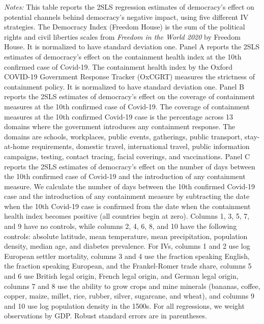 \begin{table}[!htbp]
\begin{threeparttable}
\begin{tablenotes}
\item {\footnotesize {\textit{Notes:} This table reports the 2SLS regression estimates of democracy's effect on potential channels behind democracy's negative impact, using five different IV strategies. The Democracy Index (Freedom House) is the sum of the political rights and civil liberties scales from \textit{Freedom in the World 2020} by Freedom House. It is normalized to have standard deviation one. Panel A reports the 2SLS estimates of democracy's effect on the containment health index at the 10th confirmed case of Covid-19. The containment health index by the Oxford COVID-19 Government Response Tracker (OxCGRT) measures the strictness of containment policy. It is normalized to have standard deviation one. Panel B reports the 2SLS estimates of democracy's effect on the coverage of containment measures at the 10th confirmed case of Covid-19. The coverage of containment measures at the 10th confirmed Covid-19 case is the percentage across 13 domains where the government introduces any containment response. The domains are schools, workplaces, public events, gatherings, public transport, stay-at-home requirements, domestic travel, international travel, public information campaigns, testing, contact tracing, facial coverings, and vaccinations. Panel C reports the 2SLS estimates of democracy's effect on the number of days between the 10th confirmed case of Covid-19 and the introduction of any containment measure. We calculate the number of days between the 10th confirmed Covid-19 case and the introduction of any containment measure by subtracting the date when the 10th Covid-19 case is confirmed from the date when the containment health index becomes positive (all countries begin at zero). Columns 1, 3, 5, 7, and 9 have no controls, while columns 2, 4, 6, 8, and 10 have the following controls: absolute latitude, mean temperature, mean precipitation, population density, median age, and diabetes prevalence. For IVs, columns 1 and 2 use log European settler mortality, columns 3 and 4 use the fraction speaking English, the fraction speaking European, and the Frankel-Romer trade share, columns 5 and 6 use British legal origin, French legal origin, and German legal origin, columns 7 and 8 use the ability to grow crops and mine minerals (bananas, coffee, copper, maize, millet, rice, rubber, silver, sugarcane, and wheat), and columns 9 and 10 use log population density in the 1500s. For all regressions, we weight observations by GDP. Robust standard errors are in parentheses. }}
\end{tablenotes}
\end{threeparttable}
\end{table} 